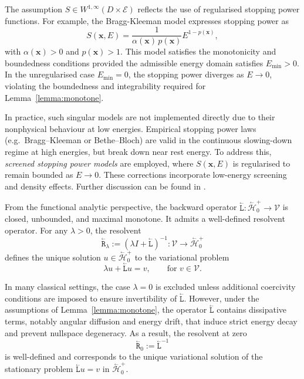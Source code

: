 \documentclass{amsart}
\newcommand{\bL}{\stackrel{_\leftarrow}{\mathtt L}}
\newcommand{\bR}{\stackrel{_\leftarrow}{\mathtt R}}
\theoremstyle{plain}
\renewcommand{\vec}[1]{\ensuremath{\boldsymbol{#1}}}
\newcommand{\cbH}{\stackrel{_\leftarrow}{\mathscr H}}
\newcommand{\cV}{\ensuremath{\mathscr V}}
\begin{document}
The assumption $S \in W^{1,\infty}(D \times \mathcal{E})$ reflects the
use of regularised stopping power functions. For example, the
Bragg-Kleeman model expresses stopping power as
\begin{equation}
  S(\vec x, E) = \dfrac{1}{\alpha(\vec x)\, p(\vec x)} E^{1 - p(\vec x)},
\end{equation}
with $\alpha(\vec x) > 0$ and $p(\vec x) > 1$. This model satisfies
the monotonicity and boundedness conditions provided the admissible
energy domain satisfies $E_{\min} > 0$. In the unregularised case
$E_{\min} = 0$, the stopping power diverges as $E \to 0$, violating
the boundedness and integrability required for
Lemma~\ref{lemma:monotone}.

In practice, such singular models are not implemented directly due to
their nonphysical behaviour at low energies. Empirical stopping power
laws (e.g.~Bragg--Kleeman or Bethe--Bloch) are valid in the
continuous slowing-down regime at high energies, but break down near
rest energy. To address this, \emph{screened stopping power models}
are employed, where $S(\vec{x}, E)$ is regularised to remain bounded as
$E \to 0$. These corrections incorporate low-energy screening and
density effects. Further discussion can be found in
\cite{chronholm2025geometry}.

From the functional analytic perspective, the backward operator
$\bL : \cbH_0^+ \to \cV$ is closed, unbounded, and maximal monotone.
It admits a well-defined resolvent operator. For any $\lambda > 0$, the
resolvent
\begin{equation}
  \bR_\lambda := (\lambda I + \bL)^{-1} : \cV \to \cbH_0^+
\end{equation}
defines the unique solution $u \in \cbH_0^+$ to the variational problem
\begin{equation}
  \label{flowfrom}
  \lambda u + \bL u = v, \qquad \text{for } v \in \cV.
\end{equation}

In many classical settings, the case $\lambda = 0$ is excluded unless
additional coercivity conditions are imposed to ensure invertibility
of $\bL$.  However, under the assumptions of Lemma~\ref{lemma:monotone},
the operator $\bL$ contains dissipative terms, notably angular
diffusion and energy drift, that induce strict energy decay and
prevent nullspace degeneracy.  As a result, the resolvent at zero
\begin{equation}
  \bR_0 := \bL^{-1}
\end{equation}
is well-defined and corresponds to the unique variational solution of
the stationary problem $\bL u = v$ in $\cbH_0^+$.
\end{document}
